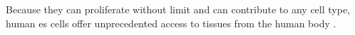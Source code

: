 Because they can proliferate without limit and can contribute to any cell type, human \gls{es} cells offer unprecedented access to tissues from the human body \cite{department2006regenerative}. 

